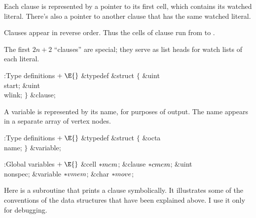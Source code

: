 Each clause is represented by a pointer to its first cell,
which
contains its watched literal. There's also a pointer to another clause
that has the same watched literal.

Clauses appear in reverse order. Thus the cells of clause  run
from  to .

The first $2n+2$ ``clauses'' are special; they serve as list heads for
watch lists of each literal.

\Y\B\4:Type definitions\X${}\mathrel+\E{}$\6
\&{typedef} \&{struct} ${}\{{}$\1\6
\&{uint} \\{start};\6
\&{uint} \\{wlink};\2\6
${}\}{}$ \&{clause};\par
\fi

A variable is represented by its name, for purposes of
output.
The name appears in a separate array  of vertex nodes.

\Y\B\4:Type definitions\X${}\mathrel+\E{}$\6
\&{typedef} \&{struct} ${}\{{}$\1\6
\&{octa} \\{name};\2\6
${}\}{}$ \&{variable};\par
\fi

\B{}:Global variables\X${}\mathrel+\E{}$\6
\&{cell} ${}{*}\\{mem}{}$;\6
\&{clause} ${}{*}\\{cmem}{}$;\6
\&{uint} \\{nonspec};\6
\&{variable} ${}{*}\\{vmem}{}$;\6
\&{char} ${}{*}\\{move}{}$;\par
\fi

Here is a subroutine that prints a clause symbolically. It
illustrates
some of the conventions of the data structures that have been explained above.
I use it only for debugging.


